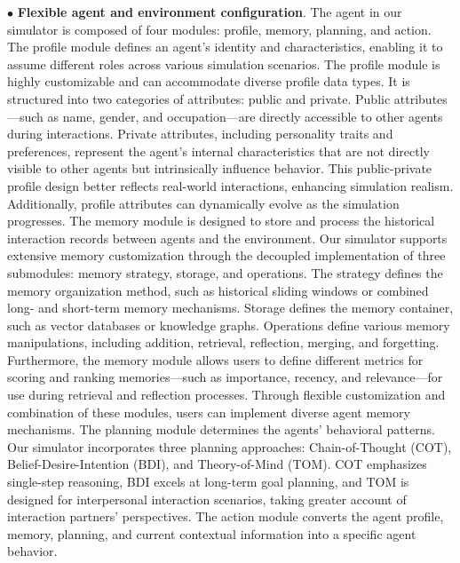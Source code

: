 \documentclass{article}
\theoremstyle{definition}
\theoremstyle{theorem}
\theoremstyle{proof}
\theoremstyle{remark}
\begin{document}
    $\bullet$ \textbf{Flexible agent and environment configuration}. 
    The agent in our simulator is composed of four modules: profile, memory, planning, and action.
    The profile module defines an agent's identity and characteristics, enabling it to assume different roles across various simulation scenarios. The profile module is highly customizable and can accommodate diverse profile data types. It is structured into two categories of attributes: public and private. Public attributes—such as name, gender, and occupation—are directly accessible to other agents during interactions. Private attributes, including personality traits and preferences, represent the agent's internal characteristics that are not directly visible to other agents but intrinsically influence behavior. This public-private profile design better reflects real-world interactions, enhancing simulation realism. Additionally, profile attributes can dynamically evolve as the simulation progresses.
    The memory module is designed to store and process the historical interaction records between agents and the environment.
    Our simulator supports extensive memory customization through the decoupled implementation of three submodules: memory strategy, storage, and operations. The strategy defines the memory organization method, such as historical sliding windows or combined long- and short-term memory mechanisms. Storage defines the memory container, such as vector databases or knowledge graphs. Operations define various memory manipulations, including addition, retrieval, reflection, merging, and forgetting. Furthermore, the memory module allows users to define different metrics for scoring and ranking memories—such as importance, recency, and relevance—for use during retrieval and reflection processes. Through flexible customization and combination of these modules, users can implement diverse agent memory mechanisms. 
    The planning module determines the agents' behavioral patterns. 
    Our simulator incorporates three planning approaches: Chain-of-Thought (COT), Belief-Desire-Intention (BDI), and Theory-of-Mind (TOM). COT emphasizes single-step reasoning, BDI excels at long-term goal planning, and TOM is designed for interpersonal interaction scenarios, taking greater account of interaction partners' perspectives.
    The action module converts the agent profile, memory, planning, and current contextual information into a specific agent behavior. 
\end{document}
